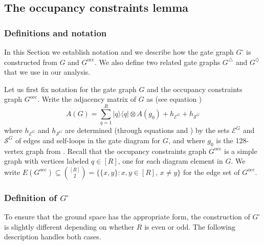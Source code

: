 \documentclass[../thesis-main/thesis-main]{subfiles}
\begin{document}
\subsection{The occupancy constraints lemma}

\subsubsection{Definitions and notation}
\label{sec:Definitions-and-Notation_G_square}

In this Section we establish notation and we describe how the gate graph $G^{\square}$ is constructed from $G$ and $G^{\text{occ}}$. We also define two related gate graphs $G^{\triangle}$ and $G^{\diamondsuit}$ that we use in our analysis.

Let us first fix notation for the gate graph $G$ and the occupancy constraints graph $G^{\text{occ}}$. Write the adjacency matrix of $G$ as (see equation ) 
\[
A(G)=\sum_{q=1}^{R}|q\rangle\langle q|\otimes A(g_{0})+h_{\mathcal{E}^{G}}+h_{\mathcal{S}^{G}}
\]
where $h_{\mathcal{E}^{G}}$ and $h_{\mathcal{S}^{G}}$ are determined (through equations  and ) by the sets $\mathcal{E}^{G}$ and $\mathcal{S}^{G}$ of edges and self-loops in the gate diagram for $G$, and where $g_0$ is the 128-vertex graph from . Recall that the occupancy constraints graph $G^{\text{occ}}$ is a simple graph with vertices labeled $q\in[R]$, one for each diagram element in $G$. We write $E(G^{\text{occ}})\subseteq\binom{[R]}{2} = \{\{x,y\}\colon x,y\in[R],\, x\neq y\}$ for the edge set of $G^{\text{occ}}$. 

\subsubsection*{Definition of $G^{\square}$}

To ensure that the ground space has the appropriate form, the construction of $G^{\square}$ is slightly different depending on whether $R$ is even or odd. The following description handles both cases.
\end{document}
